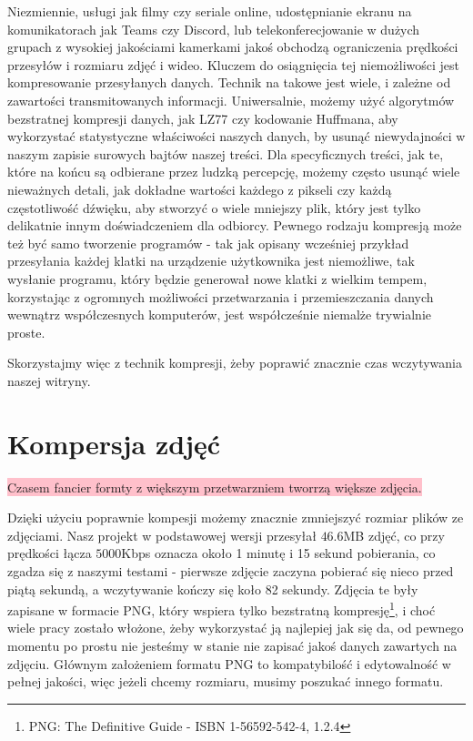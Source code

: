 \documentclass[licencjacka]{pracadypl}
\newcommand{\selfnote}[1]{\colorbox{pink}{#1}}
\begin{document}
Niezmiennie, usługi jak filmy czy seriale online, udostępnianie ekranu na komunikatorach jak Teams czy Discord, lub telekonferecjowanie w dużych grupach z wysokiej jakościami kamerkami jakoś obchodzą ograniczenia prędkości przesyłów i rozmiaru zdjęć i wideo. 
Kluczem do osiągnięcia tej niemożliwości jest kompresowanie przesyłanych danych. Technik na takowe jest wiele, i zależne od zawartości transmitowanych informacji. Uniwersalnie, możemy użyć algorytmów bezstratnej kompresji danych, jak LZ77 czy kodowanie Huffmana, aby wykorzystać statystyczne właściwości naszych danych, by usunąć niewydajności w naszym zapisie surowych bajtów naszej treści. Dla specyficznych treści, jak te, które na końcu są odbierane przez ludzką percepcję, możemy często usunąć wiele nieważnych detali, jak dokładne wartości każdego z pikseli czy każdą częstotliwość dźwięku, aby stworzyć o wiele mniejszy plik, który jest tylko delikatnie innym doświadczeniem dla odbiorcy. Pewnego rodzaju kompresją może też być samo tworzenie programów - tak jak opisany wcześniej przykład przesyłania każdej klatki na urządzenie użytkownika jest niemożliwe, tak wysłanie programu, który będzie generował nowe klatki z wielkim tempem, korzystając z ogromnych możliwości przetwarzania i przemieszczania danych wewnątrz współczesnych komputerów, jest współcześnie niemalże trywialnie proste.

Skorzystajmy więc z technik kompresji, żeby poprawić znacznie czas wczytywania naszej witryny.

\section{Kompersja zdjęć}

\selfnote{Czasem fancier formty z większym przetwarzniem tworrzą większe zdjęcia.}

Dzięki użyciu poprawnie kompesji możemy znacznie zmniejszyć rozmiar plików ze zdjęciami. Nasz projekt w podstawowej wersji przesyłał $46.6$MB zdjęć, co przy prędkości łącza $5000$Kbps oznacza około 1 minutę i 15 sekund pobierania, co zgadza się z naszymi testami - pierwsze zdjęcie zaczyna pobierać się nieco przed piątą sekundą, a wczytywanie kończy się koło 82 sekundy. Zdjęcia te były zapisane w formacie PNG, który wspiera tylko bezstratną kompresję\footnote{PNG: The Definitive Guide - ISBN 1-56592-542-4, 1.2.4}, i choć wiele pracy zostało włożone, żeby wykorzystać ją najlepiej jak się da, od pewnego momentu po prostu nie jesteśmy w stanie nie zapisać jakoś danych zawartych na zdjęciu. Głównym założeniem formatu PNG to kompatybilość i edytowalność w pełnej jakości, więc jeżeli chcemy rozmiaru, musimy poszukać innego formatu.
\end{document}
